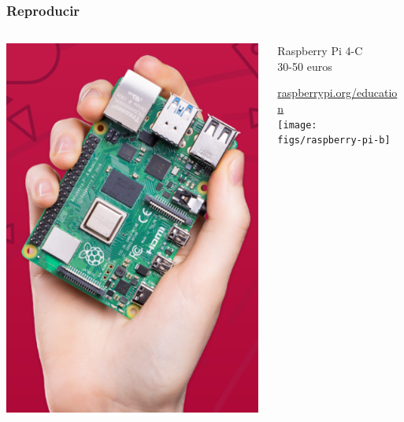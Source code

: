 \documentclass[17pt,aspectratio=169]{beamer}
\begin{document}
\begin{frame}
\frametitle{Reproducir}

\begin{columns}[T]
\begin{column}{.48\textwidth}
\includegraphics[width=0.95\linewidth]{figs/raspberry-pi}
\end{column}%
\hfill%
\begin{column}{.50\textwidth}
  {\Large
    Raspberry Pi 4-C \\
    30-50 euros \\
  }
  \vspace{1cm}
  
  {\small
    \href{https://raspberrypi.org/education}{raspberrypi.org/education} \\
  }
\texttt{[image: figs/raspberry-pi-b]}

\end{column}%
\end{columns}



\begin{flushright}
\end{flushright}

\end{frame}
\end{document}
